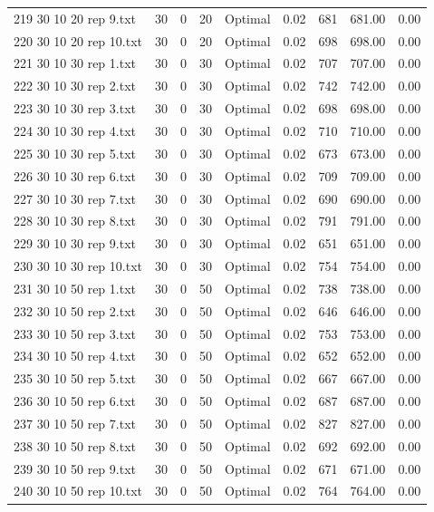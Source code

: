 \begin{longtable}{lrrllrrrr}
219 30 10 20 rep 9.txt & 30 & 0 & 20 & Optimal &  0.02 & 681 & 681.00 &  0.00\\
220 30 10 20 rep 10.txt & 30 & 0 & 20 & Optimal &  0.02 & 698 & 698.00 &  0.00\\
221 30 10 30 rep 1.txt & 30 & 0 & 30 & Optimal &  0.02 & 707 & 707.00 &  0.00\\
222 30 10 30 rep 2.txt & 30 & 0 & 30 & Optimal &  0.02 & 742 & 742.00 &  0.00\\
223 30 10 30 rep 3.txt & 30 & 0 & 30 & Optimal &  0.02 & 698 & 698.00 &  0.00\\
224 30 10 30 rep 4.txt & 30 & 0 & 30 & Optimal &  0.02 & 710 & 710.00 &  0.00\\
225 30 10 30 rep 5.txt & 30 & 0 & 30 & Optimal &  0.02 & 673 & 673.00 &  0.00\\
226 30 10 30 rep 6.txt & 30 & 0 & 30 & Optimal &  0.02 & 709 & 709.00 &  0.00\\
227 30 10 30 rep 7.txt & 30 & 0 & 30 & Optimal &  0.02 & 690 & 690.00 &  0.00\\
228 30 10 30 rep 8.txt & 30 & 0 & 30 & Optimal &  0.02 & 791 & 791.00 &  0.00\\
229 30 10 30 rep 9.txt & 30 & 0 & 30 & Optimal &  0.02 & 651 & 651.00 &  0.00\\
230 30 10 30 rep 10.txt & 30 & 0 & 30 & Optimal &  0.02 & 754 & 754.00 &  0.00\\
231 30 10 50 rep 1.txt & 30 & 0 & 50 & Optimal &  0.02 & 738 & 738.00 &  0.00\\
232 30 10 50 rep 2.txt & 30 & 0 & 50 & Optimal &  0.02 & 646 & 646.00 &  0.00\\
233 30 10 50 rep 3.txt & 30 & 0 & 50 & Optimal &  0.02 & 753 & 753.00 &  0.00\\
234 30 10 50 rep 4.txt & 30 & 0 & 50 & Optimal &  0.02 & 652 & 652.00 &  0.00\\
235 30 10 50 rep 5.txt & 30 & 0 & 50 & Optimal &  0.02 & 667 & 667.00 &  0.00\\
236 30 10 50 rep 6.txt & 30 & 0 & 50 & Optimal &  0.02 & 687 & 687.00 &  0.00\\
237 30 10 50 rep 7.txt & 30 & 0 & 50 & Optimal &  0.02 & 827 & 827.00 &  0.00\\
238 30 10 50 rep 8.txt & 30 & 0 & 50 & Optimal &  0.02 & 692 & 692.00 &  0.00\\
239 30 10 50 rep 9.txt & 30 & 0 & 50 & Optimal &  0.02 & 671 & 671.00 &  0.00\\
240 30 10 50 rep 10.txt & 30 & 0 & 50 & Optimal &  0.02 & 764 & 764.00 &  0.00\\

\end{longtable}
